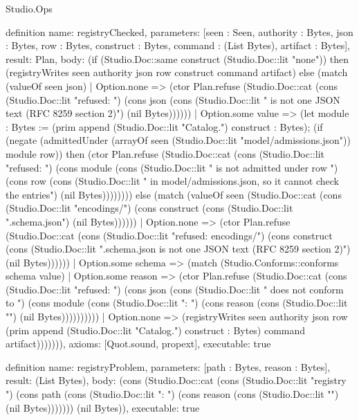 \begin{lexlean}{Studio.Ops}
\begin{semanticmodule}
{definition{
  name: registryChecked,
  parameters: [seen : Seen, authority : Bytes, json : Bytes, row : Bytes, construct : Bytes, command : (List Bytes), artifact : Bytes],
  result: Plan,
  body: (if (Studio.Doc::same construct (Studio.Doc::lit "none")) then (registryWrites seen authority json row construct command artifact) else (match (valueOf seen json)
    | Option.none => (ctor Plan.refuse (Studio.Doc::cat (cons (Studio.Doc::lit "refused: ") (cons json (cons (Studio.Doc::lit " is not one JSON text (RFC 8259 section 2)\n") (nil Bytes))))))
    | Option.some value => (let module : Bytes := (prim append (Studio.Doc::lit "Catalog.") construct : Bytes); (if (negate (admittedUnder (arrayOf seen (Studio.Doc::lit "model/admissions.json")) module row)) then (ctor Plan.refuse (Studio.Doc::cat (cons (Studio.Doc::lit "refused: ") (cons module (cons (Studio.Doc::lit " is not admitted under row ") (cons row (cons (Studio.Doc::lit " in model/admissions.json, so it cannot check the entries\n") (nil Bytes)))))))) else (match (valueOf seen (Studio.Doc::cat (cons (Studio.Doc::lit "encodings/") (cons construct (cons (Studio.Doc::lit ".schema.json") (nil Bytes))))))
      | Option.none => (ctor Plan.refuse (Studio.Doc::cat (cons (Studio.Doc::lit "refused: encodings/") (cons construct (cons (Studio.Doc::lit ".schema.json is not one JSON text (RFC 8259 section 2)\n") (nil Bytes))))))
      | Option.some schema => (match (Studio.Conforms::conforms schema value)
        | Option.some reason => (ctor Plan.refuse (Studio.Doc::cat (cons (Studio.Doc::lit "refused: ") (cons json (cons (Studio.Doc::lit " does not conform to ") (cons module (cons (Studio.Doc::lit ": ") (cons reason (cons (Studio.Doc::lit "\n") (nil Bytes))))))))))
        | Option.none => (registryWrites seen authority json row (prim append (Studio.Doc::lit "Catalog.") construct : Bytes) command artifact))))))),
  axioms: [Quot.sound, propext],
  executable: true
}

definition{
  name: registryProblem,
  parameters: [path : Bytes, reason : Bytes],
  result: (List Bytes),
  body: (cons (Studio.Doc::cat (cons (Studio.Doc::lit "registry ") (cons path (cons (Studio.Doc::lit ": ") (cons reason (cons (Studio.Doc::lit "\n") (nil Bytes))))))) (nil Bytes)),
  executable: true
}

}
\end{semanticmodule}
\end{lexlean}
